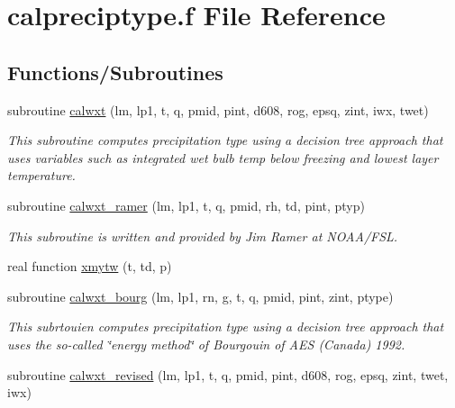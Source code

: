 \hypertarget{calpreciptype_8f}{}\section{calpreciptype.\+f File Reference}
\label{calpreciptype_8f}
\subsection*{Functions/\+Subroutines}
\begin{DoxyCompactItemize}
\item 
subroutine \hyperlink{calpreciptype_8f_ace3ba03fce51ab8bd25977ff03a99c1d}{calwxt} (lm, lp1, t, q, pmid, pint,                                                                                                                                                   d608, rog, epsq, zint, iwx, twet)
\begin{DoxyCompactList}\small\item\em This subroutine computes precipitation type using a decision tree approach that uses variables such as integrated wet bulb temp below freezing and lowest layer temperature. \end{DoxyCompactList}\item 
subroutine \hyperlink{calpreciptype_8f_a1359538b0437522a5643286d47cb956d}{calwxt\+\_\+ramer} (lm, lp1, t, q, pmid, rh, td, pint, ptyp)
\begin{DoxyCompactList}\small\item\em This subroutine is written and provided by Jim Ramer at N\+O\+A\+A/\+F\+SL. \end{DoxyCompactList}\item 
real function \hyperlink{calpreciptype_8f_a761529912bd612dc070ad13eb14de778}{xmytw} (t, td, p)
\item 
subroutine \hyperlink{calpreciptype_8f_aeb6ff6c9bfe0ac826d6b0e28c0592223}{calwxt\+\_\+bourg} (lm, lp1, rn, g, t, q, pmid, pint, zint, ptype)
\begin{DoxyCompactList}\small\item\em This subrtouien computes precipitation type using a decision tree approach that uses the so-\/called \char`\"{}energy method\char`\"{} of Bourgouin of A\+ES (Canada) 1992. \end{DoxyCompactList}\item 
subroutine \hyperlink{calpreciptype_8f_aea4e1369bc96598ada546c7aa96988cd}{calwxt\+\_\+revised} (lm, lp1, t, q, pmid, pint,                                                                                                                                                               d608, rog, epsq, zint, twet, iwx)

\end{DoxyCompactItemize}
